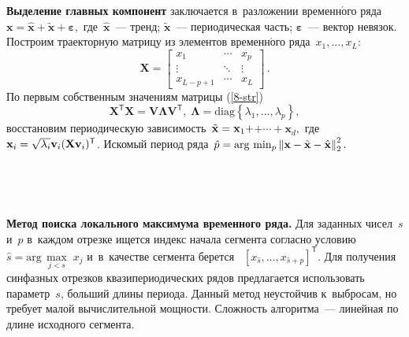 \begin{multicols}{2}
\textbf{Выделение главных компонент} заключается в~разложении 
временн$\acute{\mbox{о}}$го ряда
$\mathbf{x}=\hat{\mathbf{x}}+\tilde{\mathbf{x}}+\boldsymbol{\varepsilon},
$
где~$\mathbf{\hat{x}}$~--- тренд; $\mathbf{\tilde{x}}$~--- периодическая часть; 
$\boldsymbol{\varepsilon}$~--- вектор невязок.
Построим траекторную матрицу из элементов временн$\acute{\mbox{о}}$го 
ряда~$x_1,\ldots,x_L$:
$$
\mathbf{X}=\begin{bmatrix} 
x_1 & \cdots & x_p \\ 
\vdots & \ddots & \vdots \\ 
x_{L-p+1} & \cdots & x_L \end{bmatrix}\,.
$$
По первым собственным значениям матрицы (\ref{8-str})
$$
\textbf{X}^\mathsf{T}\textbf{X}=\textbf{V}\boldsymbol{\Lambda} 
\textbf{V}^\mathsf{T},\; \boldsymbol{\Lambda}=\mathrm{diag}
\left\{\lambda_1,\ldots,\lambda_p\right\},
$$
восстановим периодическую зависимость~$\tilde {\textbf{x}}\hm=\textbf{x}_1
+$\linebreak $+\cdots+\textbf{x}_d,$ где \mbox{$\mathbf{x}_i\hm=\sqrt{\lambda_i}
\textbf{v}_i(\textbf{Xv}_i)^\mathsf{T}$}.
Искомый период ряда~$\hat{p}\hm= 
\mathop{\mathrm{arg}}\,\min\nolimits_{p} 
\norm{\textbf{x} - \tilde{\textbf{x}} - \hat{\textbf{x}}}_2^2.$

\begin{figure*}[b] %
\vspace*{12pt}
 \begin{center}  
  \mbox{%
 \epsfxsize=159.635mm 
 }
\end{center}
\vspace*{-11pt}
    \label{ris:cs}
\vspace*{9pt}
 \begin{center}  
  \mbox{%
 \epsfxsize=162.546mm 
 }
\end{center}
\vspace*{-11pt}
    \label{ris:sm1}
\end{figure*}

\textbf{Метод поиска локального максимума временного ряда.}
Для заданных чисел~$s$ и~$p$ в~каждом отрезке ищется индекс 
начала сегмента согласно условию
$
\hat{s}= \mathrm{arg}\,\underset{j<s}{\max}\; x_j$ и~в~качестве 
сегмента берется ~$[x_{\hat{s}},\ldots,x_{\hat{s}+p}]^\mathsf{T}.$ 
Для получения синфазных отрезков квазипериодических рядов 
предлагается использовать параметр~$s$, больший длины периода. 
Данный метод неустойчив к~выбросам, но требует малой вычислительной 
мощности. Сложность алгоритма~--- линейная по длине исходного сегмента.


\end{multicols}
